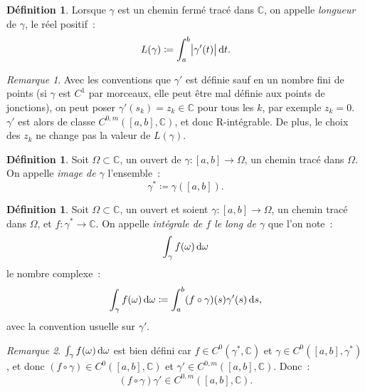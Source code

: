 \documentclass{report}
\theoremstyle{definition}
\newtheorem{déf}[thm]{Définition}
\theoremstyle{remark}
\newtheorem*{rmq}{Remarque}
\numberwithin{equation}{section}
\newcommand{\C}{\mathbb C}
\begin{document}
			\begin{déf} Lorsque $\gamma$ est un chemin fermé tracé dans $\C$, on appelle \textit{longueur} de $\gamma$, le réel positif~:
			\begin{equation}
				L(\gamma) \coloneqq \int_a^b\abs {\gamma'(t)}\dif t.
			\end{equation}
			\end{déf}

			\begin{rmq} Avec les conventions que $\gamma'$ est définie sauf en un nombre fini de points (si $\gamma$ est $C^1$ par morceaux, elle peut être mal
			définie aux points de jonctions), on peut poser $\gamma'(s_k) = z_k \in \C$ pour tous les $k$, par exemple $z_k = 0$. $\gamma'$ est alors de classe
			$C^{0,m}([a, b], \C)$, et donc R-intégrable. De plus, le choix des $z_k$ ne change pas la valeur de $L(\gamma)$.
			\end{rmq}

			\begin{déf} Soit $\Omega \subset \C$, un ouvert de $\gamma : [a, b] \to \Omega$, un chemin tracé dans $\Omega$. On appelle \textit{image de $\gamma$}
			l'ensemble~:
			\begin{equation}
				\gamma^* \coloneqq \gamma\left([a, b]\right).
			\end{equation}
			\end{déf}

			\begin{déf} Soit $\Omega \subset \C$, un ouvert et soient $\gamma : [a, b] \to \Omega$, un chemin tracé dans $\Omega$, et $f : \gamma^* \to \C$.
			On appelle \textit{intégrale de $f$ le long de $\gamma$} que l'on note~:
			\begin{equation}
				\int_\gamma f(\omega)\dif \omega
			\end{equation}
			le nombre complexe~:
			\begin{equation}
				\int_\gamma f(\omega)\dif \omega \coloneqq \int_a^b(f \circ \gamma)(s) \gamma'(s)\dif s,
			\end{equation}
			avec la convention usuelle sur $\gamma'$.
			\end{déf}

			\begin{rmq} $\int_\gamma f(\omega)\dif \omega$ est bien défini car $f \in C^0(\gamma^*, \C)$ et $\gamma \in C^0([a, b], \gamma^*)$, et donc
			$(f \circ \gamma) \in C^0([a, b], \C)$ et $\gamma' \in C^{0,m}([a, b], \C)$. Donc~:
			\begin{equation}
				\left(f \circ \gamma\right) \gamma' \in C^{0,m}\left([a, b], \C\right).
			\end{equation}
			\end{rmq}
\end{document}
